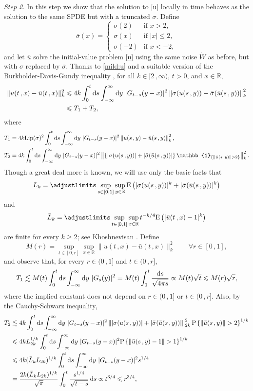 \documentclass[reqno]{amsart}
\newcommand{\<}{\langle}
\renewcommand{\>}{\rangle}
\newcommand{\R}{\mathbb{R}}
\newcommand{\lip}{\text{Lip}}
\renewcommand{\P}{\mathrm{P}}
\newcommand{\E}{\mathrm{E}}
\newcommand{\1}{\mathbb{1}}
\renewcommand{\d}{{\rm d}}
\renewcommand{\ge}{\geqslant}
\renewcommand{\le}{\leqslant}
\theoremstyle{definition}
\numberwithin{equation}{section}
\begin{document}
\noindent\emph{Step 2.} In this step we show that the solution to \eqref{u}
locally in time behaves as the solution to the same SPDE but with a truncated
$\sigma$. Define
\[
	\bar\sigma(x) = \begin{cases}
		\sigma(2)&\text{if $x>2$},\\
		\sigma(x)&\text{if $|x|\le2$},\\
		\sigma(-2)&\text{if $x<-2$},
	\end{cases}
\]
and let $\bar{u}$ solve the initial-value problem \eqref{u} using
the same noise $\dot{W}$ as before, but
with $\sigma$ replaced by $\bar\sigma$. Thanks to \eqref{mild:u}
and a suitable version of the Burkholder-Davis-Gundy inequality \cite[Proposition 5.2]{CBMS},
for all $k\in[2\,,\infty)$, $t>0$, and $x\in\R$,
\begin{align}
	\| u(t\,,x) - \bar{u}(t\,,x) \|_k^2
	&\le 4k\int_0^t\d s\int_{-\infty}^\infty\d y\
	|G_{t-s}(y-x)|^2 \left\| \sigma(u(s\,,y)) - \bar\sigma(\bar{u}(s\,,y))
	\right\|_k^2 \notag\\
	&\le T_1 + T_2,
	\label{u-bar(u)}
\end{align}
where
\begin{align*}
	T_1 &= 4k\lip(\sigma)^2\int_0^t\d s\int_{-\infty}^\infty\d y\
		|G_{t-s}(y-x)|^2 \left\| u(s\,,y) -\bar{u}(s\,,y)
		\right\|_k^2,\\
	T_2 &= 4k\int_0^t\d s\int_{-\infty}^\infty\d y\
		|G_{t-s}(y-x)|^2 \left\| \left\{ |\sigma(u(s\,,y))| + |\bar\sigma(\bar{u}(s\,,y))|\right\}
		\1_{\{\|\bar{u}(s\,,y)\|>2\}}\right\|_k^2.
\end{align*}
Though a great deal more is known,
we will use only the basic facts that
\[
	L_k = \adjustlimits\sup_{s\in[0,1]}\sup_{y\in\R} 
	\E\left( |\sigma(u(s\,,y))|^k+|\bar{\sigma}(\bar{u}(s\,,y))|^k\right)
\]
and
\[
	\bar{L}_k = \adjustlimits\sup_{t\in[0,1]}\sup_{x\in\R}
	t^{-k/4} \E\left( | \bar{u}(t\,,x) - 1|^k\right)
\]
are finite for every $k\ge2$; see Khoshnevisan \cite[Lemma 5.4 and Theorem 5.5]{CBMS}. Define
\[
	M(r) = \sup_{t \in [0,r]} 
	\sup_{x\in\R} \|u(t\,,x) - \bar{u}(t\,,x) \|_k^2
	\qquad\forall r\in[0\,,1],
\]
and observe that, for every $r \in (0\,,1]$ and $t\in(0\,,r]$,
\[
	T_1 \lesssim M(t)\int_0^t\d s\int_{-\infty}^\infty\d y\ |G_s(y)|^2 	
	= M(t)\int_0^t\frac{\d s}{\sqrt{4\pi s}}\propto M(t)\sqrt{t} \le M(r) \sqrt{r},
\]
where the implied constant does not depend on $r \in (0\,,1]$ or $t\in(0\,,r]$. Also,
by the Cauchy-Schwarz inequality,
\begin{align*}
	T_2 &\lesssim 4k\int_0^t\d s\int_{-\infty}^\infty\d y\
		|G_{t-s}(y-x)|^2 \left\|  |\sigma(u(s\,,y))| + |\bar\sigma(\bar{u}(s\,,y))| \right\|_{2k}^2
		\P\left\{\|\bar{u}(s\,,y)\|>2\right\}^{1/k}\\
	&\le 4kL_{2k}^{1/k}\int_0^t\d s\int_{-\infty}^\infty\d y\
		|G_{t-s}(y-x)|^2  	\P\left\{\|\bar{u}(s\,,y)-1\|>1\right\}^{1/k}\\
	&\le 4k (\bar{L}_kL_{2k})^{1/k}\int_0^t\d s\int_{-\infty}^\infty\d y\
		|G_{t-s}(y-x)|^2 s^{1/4}\\
		& =\frac{2k (\bar{L}_kL_{2k})^{1/k}}{\sqrt\pi}
		\int_0^t \frac{s^{1/4}}{\sqrt{t-s}}\,\d s
		\propto t^{3/4} \le r^{3/4},
\end{align*}
\end{document}

